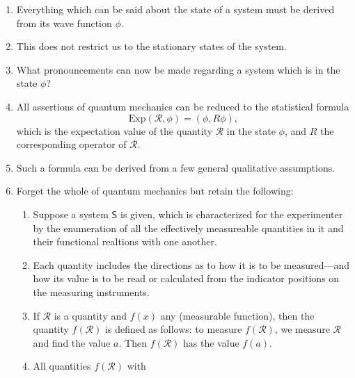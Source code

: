 \documentclass[a4paper]{article}
\theoremstyle{definition}
\theoremstyle{plain}
\begin{document}
    \begin{enumerate}
        \item Everything which can be said about the state
            of a system must be derived from its wave
            function $\phi$.
        \item This does not restrict us to the stationary
            states of the system.
        \item What pronouncements can now be made regarding
            a system which is in the state $\phi$?
        \item All assertions of quantum mechanics can be
            reduced to the statistical formula 
            \begin{equation}
                \text{Exp}(\mathcal{R},\phi)
                = (\phi, R\phi),
            \end{equation}
            which is the expectation value of the quantity
            $\mathcal{R}$ in the state $\phi$, and $R$ the
            corresponding operator of $\mathcal{R}$.
        \item Such a formula can be derived from a few
            general qualitative assumptions.
        \item Forget the whole of quantum mechanics but
            retain the following:
            \begin{enumerate}
                \item Suppose a system $\mathsf{S}$ is
                    given, which is characterized for the
                    experimenter by the enumeration of all
                    the effectively measureable quantities
                    in it and their functional realtions
                    with one another.
                \item Each quantity includes the directions
                    as to how it is to be measured---and how
                    its value is to be read or calculated
                    from the indicator positions on the
                    measuring instruments.
                \item If $\mathcal{R}$ is a quantity and
                    $f(x)$ any (measurable function), then
                    the quantity $f(\mathcal{R})$ is defined
                    as follows: to measure $f(\mathcal{R})$,
                    we measure $\mathcal{R}$ and find the
                    value $a$. Then $f(\mathcal{R})$ has the
                    value $f(a)$. 
                \item All quantities $f(\mathcal{R})$ with

\end{enumerate}
\end{enumerate}
\end{document}
